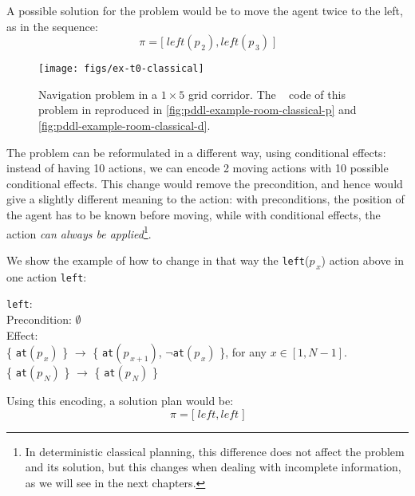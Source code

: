 \begin{example}
A possible solution for the problem would be to move the agent twice to the left, as in the sequence:
\begin{equation*}
 \pi = \bigl[\; \mathit{left}(p_{\,2}),  \mathit{left}(p_{\,3}) \;\bigr]
\end{equation*}

 \begin{figure}[h!bt]
   \centering
\texttt{[image: figs/ex-t0-classical]}   
  \caption[Navigation problem in a grid corridor.]{Navigation problem in a $1\times 5$ grid corridor. 
The \pddl ~ code of this problem in reproduced in \autoref{fig:pddl-example-room-classical-p} and \ref{fig:pddl-example-room-classical-d}.\label{fig:example-room-classical}}
\end{figure}

The problem can be reformulated in a different way, using conditional effects: instead of having 10 actions,
we can encode 2 moving actions with 10 possible conditional effects. This change would remove the precondition, and 
hence would give a slightly different meaning to the action: with preconditions, the position of the agent has to be known before
moving, while with conditional effects, the action \emph{can always be applied}\footnote{In deterministic classical planning, this difference
does not affect the problem and its solution, but this changes when dealing with incomplete information, as we will see in the next chapters.}.
 
We show the example of how to change in that way the  \texttt{left}($p_{\,x}$) action above in one action \texttt{left}:

\texttt{left}: \\
    \hspace*{3mm}Precondition: $\emptyset$ \hspace{3mm}\\
    \hspace*{3mm}Effect: \\
  \hspace*{5mm}\{ \texttt{at}$(p_{\,x})$ \} $\longrightarrow$ \{ \texttt{at}$(p_{\,x+1})$, $\neg$\texttt{at}$(p_{\,x})$ \},
\hspace*{2mm} for any $x \in [1, N-1]$.\\
\hspace*{5mm}\{ \texttt{at}$(p_{\,N})$ \} $\longrightarrow$ \{ \texttt{at}$(p_{\,N})$ \}

Using this encoding, a solution plan would be:
\begin{equation*}
 \pi = \bigl[\; \mathit{left}, \mathit{left} \;\bigr]
\end{equation*}
%
\end{example}
%


